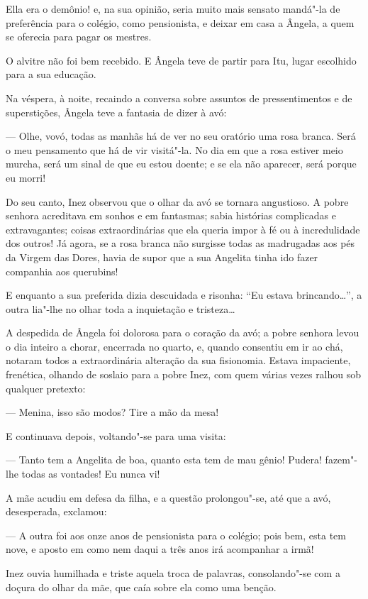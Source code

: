 Ella era o demônio! e, na sua opinião, seria muito mais sensato mandá"-la
de preferência para o colégio, como pensionista, e deixar em casa a
Ângela, a quem se oferecia para pagar os mestres.

O alvitre não foi bem recebido. E Ângela teve de partir para Itu, lugar
escolhido para a sua educação.

Na véspera, à noite, recaindo a conversa sobre assuntos de
pressentimentos e de superstições, Ângela teve a fantasia de dizer à
avó:

--- Olhe, vovó, todas as manhãs há de ver no seu oratório uma rosa
branca. Será o meu pensamento que há de vir visitá"-la. No dia em que a
rosa estiver meio murcha, será um sinal de que eu estou doente; e se ela
não aparecer, será porque eu morri!

Do seu canto, Inez observou que o olhar da avó se tornara angustioso. A
pobre senhora acreditava em sonhos e em fantasmas; sabia histórias
complicadas e extravagantes; coisas extraordinárias que ela queria impor
à fé ou à incredulidade dos outros! Já agora, se a rosa branca não
surgisse todas as madrugadas aos pés da Virgem das Dores, havia de supor
que a sua Angelita tinha ido fazer companhia aos querubins!

E enquanto a sua preferida dizia descuidada e risonha: ``Eu estava
brincando\ldots{}'', a outra lia"-lhe no olhar toda a inquietação e
tristeza\ldots{}

A despedida de Ângela foi dolorosa para o coração da avó; a pobre
senhora levou o dia inteiro a chorar, encerrada no quarto, e, quando
consentiu em ir ao chá, notaram todos a extraordinária alteração da sua
fisionomia. Estava impaciente, frenética, olhando de soslaio para a
pobre Inez, com quem várias vezes ralhou sob qualquer pretexto:

--- Menina, isso são modos? Tire a mão da mesa!

E continuava depois, voltando"-se para uma visita:

--- Tanto tem a Angelita de boa, quanto esta tem de mau gênio! Pudera!
fazem"-lhe todas as vontades! Eu nunca vi!

A mãe acudiu em defesa da filha, e a questão prolongou"-se, até que a
avó, desesperada, exclamou:

--- A outra foi aos onze anos de pensionista para o colégio; pois bem,
esta tem nove, e aposto em como nem daqui a três anos irá acompanhar a
irmã!

Inez ouvia humilhada e triste aquela troca de palavras, consolando"-se
com a doçura do olhar da mãe, que caía sobre ela como uma benção.


